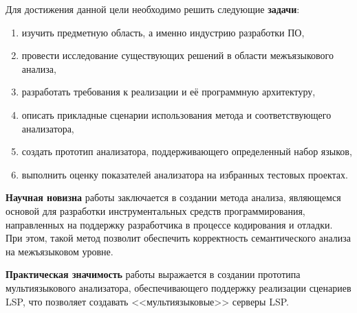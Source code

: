 Для достижения данной цели необходимо решить следующие \textbf{задачи}:
\begin{enumerate}[1)]
    \item изучить предметную область, а именно индустрию разработки ПО,
    \item провести исследование существующих решений в области межъязыкового анализа,
    \item разработать требования к реализации и её программную архитектуру,
    \item описать прикладные сценарии использования метода и соответствующего анализатора,
    \item создать прототип анализатора, поддерживающего определенный набор языков,
    \item выполнить оценку показателей анализатора на избранных тестовых проектах.
\end{enumerate}

\textbf{Научная новизна} работы заключается в создании метода анализа, являющемся основой для разработки инструментальных средств программирования, направленных
на поддержку разработчика в процессе кодирования и отладки. При этом, такой метод позволит
обеспечить корректность семантического анализа на межъязыковом уровне.

\textbf{Практическая значимость} работы выражается в создании прототипа мультиязыкового
анализатора, обеспечивающего поддержку реализации сценариев LSP, что позволяет
создавать <<мультиязыковые>> серверы LSP.

